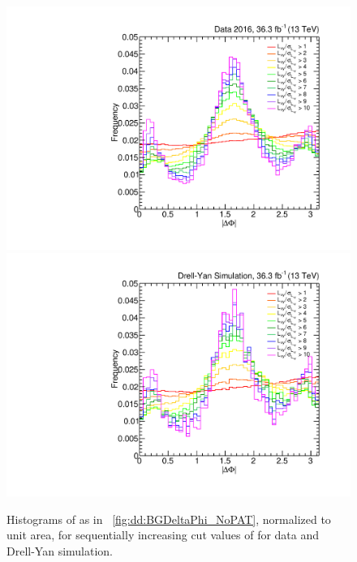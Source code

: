 \begin{figure}[t]
  \centering
  \includegraphics[width=\DSquareWidth]{figures/displaced/BGEST_EffectOfLxySigCut_DeltaPhi_Data_DY-Like.pdf}
  \hspace*{-2em}
  \includegraphics[width=\DSquareWidth]{figures/displaced/BGEST_EffectOfLxySigCut_DeltaPhi_MC_DY-Like.pdf}
  \caption[Histograms of \DeltaPhi for sequentially increasing cut values of \LxySig in data and Drell-Yan simulation.]{Histograms of \DeltaPhi as in \Fig~\ref{fig:dd:BGDeltaPhi_NoPAT}, normalized to unit area, for sequentially increasing cut values of \LxySig for  data and  Drell-Yan simulation.}
  \label{fig:dd:SeqLxySig}
\end{figure}

